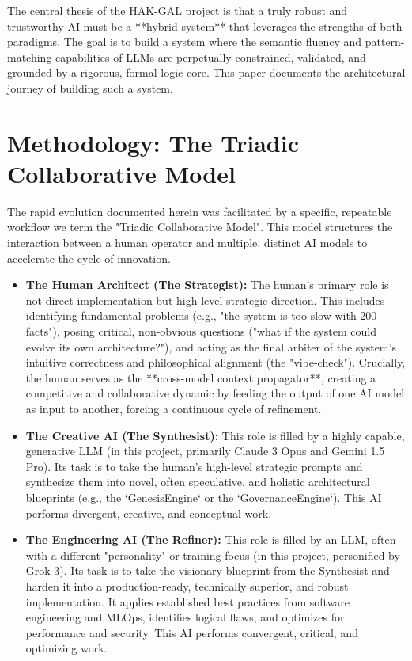 \documentclass[11pt, a4paper]{article}
\begin{document}
The central thesis of the HAK-GAL project is that a truly robust and trustworthy AI must be a **hybrid system** that leverages the strengths of both paradigms. The goal is to build a system where the semantic fluency and pattern-matching capabilities of LLMs are perpetually constrained, validated, and grounded by a rigorous, formal-logic core. This paper documents the architectural journey of building such a system.

\section{Methodology: The Triadic Collaborative Model}
\label{sec:methodology}

The rapid evolution documented herein was facilitated by a specific, repeatable workflow we term the "Triadic Collaborative Model". This model structures the interaction between a human operator and multiple, distinct AI models to accelerate the cycle of innovation.

\begin{itemize}
    \item \textbf{The Human Architect (The Strategist):} The human's primary role is not direct implementation but high-level strategic direction. This includes identifying fundamental problems (e.g., "the system is too slow with 200 facts"), posing critical, non-obvious questions ("what if the system could evolve its own architecture?"), and acting as the final arbiter of the system's intuitive correctness and philosophical alignment (the "vibe-check"). Crucially, the human serves as the **cross-model context propagator**, creating a competitive and collaborative dynamic by feeding the output of one AI model as input to another, forcing a continuous cycle of refinement.
    
    \item \textbf{The Creative AI (The Synthesist):} This role is filled by a highly capable, generative LLM (in this project, primarily Claude 3 Opus and Gemini 1.5 Pro). Its task is to take the human's high-level strategic prompts and synthesize them into novel, often speculative, and holistic architectural blueprints (e.g., the `GenesisEngine` or the `GovernanceEngine`). This AI performs divergent, creative, and conceptual work.
    
    \item \textbf{The Engineering AI (The Refiner):} This role is filled by an LLM, often with a different "personality" or training focus (in this project, personified by Grok 3). Its task is to take the visionary blueprint from the Synthesist and harden it into a production-ready, technically superior, and robust implementation. It applies established best practices from software engineering and MLOps, identifies logical flaws, and optimizes for performance and security. This AI performs convergent, critical, and optimizing work.
\end{itemize}
\end{document}
